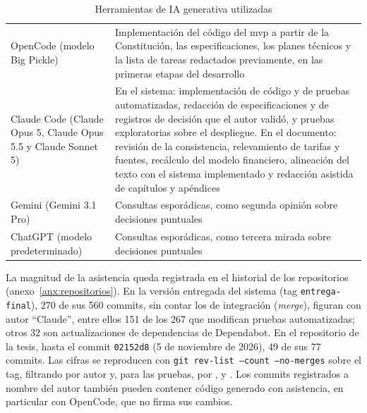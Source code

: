 \begin{table}[H]
    \centering
    \caption{Herramientas de IA generativa utilizadas}
    \label{tab:herramientas-ia}
    \small
    \begin{tabularx}{\textwidth}{>{\raggedright\arraybackslash}p{4.2cm} L}
        \toprule
         &  \\
        \midrule
        OpenCode (modelo Big Pickle) & Implementación del código del \gls{mvp} a partir de la Constitución, las especificaciones, los planes técnicos y la lista de tareas redactados previamente, en las primeras etapas del desarrollo \\
        Claude Code (Claude Opus 5, Claude Opus 5.5 y Claude Sonnet 5) & En el sistema: implementación de código y de pruebas automatizadas, redacción de especificaciones y de registros de decisión que el autor validó, y pruebas exploratorias sobre el despliegue. En el documento: revisión de la consistencia, relevamiento de tarifas y fuentes, recálculo del modelo financiero, alineación del texto con el sistema implementado y redacción asistida de capítulos y apéndices \\
        Gemini (Gemini 3.1 Pro) & Consultas esporádicas, como segunda opinión sobre decisiones puntuales \\
        ChatGPT (modelo predeterminado) & Consultas esporádicas, como tercera mirada sobre decisiones puntuales \\
        \bottomrule
    \end{tabularx}
\end{table}

La magnitud de la asistencia queda registrada en el historial de los
repositorios (anexo~\ref{anx:repositorios}). En la versión entregada del
sistema (tag \texttt{entrega-final}), 270 de sus 560 commits, sin contar
los de integración (\textit{merge}), figuran con autor ``Claude'', entre
ellos 151 de los 267 que modifican pruebas automatizadas; otros 32 son
actualizaciones de dependencias de Dependabot. En el repositorio de la
tesis, hasta el commit \texttt{02152d8} (5 de noviembre de 2026), 49 de
sus 77 commits. Las cifras se
reproducen con \texttt{git rev-list --count --no-merges} sobre el tag,
filtrando por autor y, para las pruebas, por ,
 y . Los commits registrados a nombre del autor
también pueden contener código generado con asistencia, en particular
con OpenCode, que no firma sus cambios.

